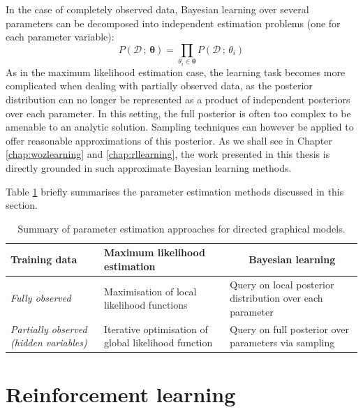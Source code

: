 In the case of completely observed data, Bayesian learning over several parameters can be decomposed into independent estimation problems (one for each parameter variable): 
\begin{equation}
P(\mathcal{D} \, ; \, \boldsymbol\theta) = \prod_{\theta_i \in \boldsymbol\theta} P(\mathcal{D} \, ; \, \theta_i)
\end{equation}
As in the maximum likelihood estimation case, the learning task becomes more complicated when dealing with partially observed data, as the posterior distribution can no longer be represented as a product of independent posteriors over each parameter.  In this setting, the full posterior is often too complex to be amenable to an analytic solution.  Sampling techniques can however be applied to offer reasonable approximations of this posterior.  As we shall see in Chapter \ref{chap:wozlearning} and \ref{chap:rllearning}, the work presented in this thesis is directly grounded in such approximate Bayesian learning methods. 

Table \ref{table:gmlearning} briefly summarises the parameter estimation methods discussed in this section.

\begin{table}[h]
\renewcommand{\arraystretch}{1.8}
\setlength{\tabcolsep}{10pt}
\vspace{3mm}
\begin{center}
\begin{tabular}{|p{30mm}||p{42mm}|p{48mm}|} \hline 
\centering \textbf{Training data} & \centering \textbf{Maximum likelihood estimation} &  $\ \ \ \ \ \ \ $ \textbf{Bayesian learning} \\ \hline
\textit{Fully observed} & Maximisation of local $\phantom{aa}$ likelihood functions & Query on local posterior distribution over each parameter \\
\textit{Partially observed (hidden variables)} &  Iterative optimisation of global likelihood function &  Query on full posterior over parameters via sampling \vspace{2mm} \\  \hline
\end{tabular}
\end{center}
\caption{Summary of parameter estimation approaches for directed graphical models.}
\label{table:gmlearning}
\end{table}


\section{Reinforcement learning}
\label{sec:rl}

